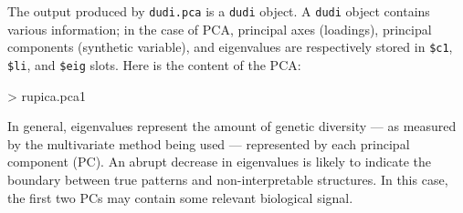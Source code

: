 \documentclass{article}
\begin{document}
\noindent The output produced by \texttt{dudi.pca} is a \texttt{dudi} object.
A \texttt{dudi} object contains various information; in the case of
PCA, principal axes (loadings), principal components (synthetic variable), and eigenvalues are respectively
stored in \texttt{\$c1}, \texttt{\$li}, and \texttt{\$eig} slots.
Here is the content of the PCA:
\begin{Schunk}
\begin{Sinput}
> rupica.pca1
\end{Sinput}
\end{Schunk}

In general, eigenvalues represent the amount of genetic diversity --- as measured by
the multivariate method being used --- represented by each principal component (PC).
An abrupt decrease in eigenvalues is likely to indicate the boundary
between true patterns and non-interpretable structures.
In this case, the first two PCs may contain some relevant biological signal.
\\
\end{document}
